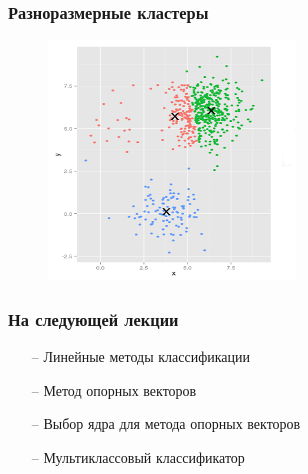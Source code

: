 \documentclass[12pt]{beamer}
\begin{document}
\begin{frame}\frametitle{Разноразмерные кластеры}
\begin{figure}[htbp]
  \includegraphics[height=180pt, keepaspectratio = true]{images/different_sizes-2}  
\end{figure}
\end{frame}

\begin{frame}\frametitle{На следующей лекции}
\begin{itemize}
\item[--] Линейные методы классификации
\item[--] Метод опорных векторов
\item[--] Выбор ядра для метода опорных векторов
\item[--] Мультиклассовый классификатор
\end{itemize}
\end{frame}
\end{document}
